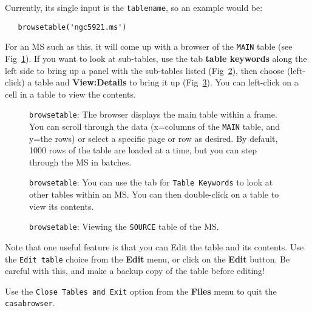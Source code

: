 Currently, its single input is the {\tt tablename}, so an example would
be:
\small
\begin{verbatim}
   browsetable('ngc5921.ms')
\end{verbatim}
\normalsize
For an MS such as this, it will come up with a browser of the 
{\tt MAIN} table (see Fig~\ref{fig:qcasabrowser1}).  
If you want to look at sub-tables, use the tab 
{\bf table keywords} along the left side to bring up a panel with the sub-tables
listed (Fig~\ref{fig:qcasabrowser2}), then choose (left-click) a table and
{\bf View:Details} to bring it up (Fig~\ref{fig:qcasabrowser3}).  
You can left-click on a cell in a table to view the
contents.

\begin{figure}[h!]
\begin{center}
\caption{\label{fig:qcasabrowser1} {\tt browsetable}: The browser displays
  the main table within a frame. You can scroll
  through the data (x=columns of the {\tt MAIN} table, and y=the rows) or
  select a specific page or row as desired.  By default, 1000 rows of
  the table are loaded at a time, but you can step through the MS in batches.} 
\hrulefill
\end{center}
\end{figure}

\begin{figure}[h!]
\begin{center}
\caption{\label{fig:qcasabrowser2} {\tt browsetable}: You can use the
  tab for {\tt Table Keywords} to look at other tables within an MS.
  You can then double-click on a table to view its contents.} 
\hrulefill
\end{center}
\end{figure}
 
\begin{figure}[h!]
\begin{center}
\caption{\label{fig:qcasabrowser3} {\tt browsetable}: Viewing the 
{\tt SOURCE} table of the MS.}
\hrulefill
\end{center}
\end{figure}

Note that one useful feature is that you can Edit the table and its
contents.  Use the {\tt Edit table} choice from the {\bf Edit} menu,
or click on the {\bf Edit} button.  Be careful with this, and make
a backup copy of the table before editing!

Use the {\tt Close Tables and Exit} option from the {\bf Files} menu
to quit the {\tt casabrowser}.

